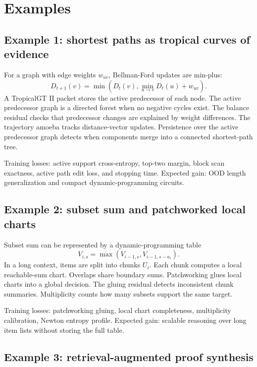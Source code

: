 \documentclass[11pt]{article}
\begin{document}
\section{Examples}

\subsection{Example 1: shortest paths as tropical curves of evidence}

For a graph with edge weights \(w_{uv}\), Bellman-Ford updates are min-plus:
\begin{equation}
D_{t+1}(v)=\min\left(D_t(v),\min_{u\to v}D_t(u)+w_{uv}\right).
\end{equation}
A TropicalGT II packet stores the active predecessor of each node.  The active predecessor graph is a directed forest when no negative cycles exist.  The balance residual checks that predecessor changes are explained by weight differences.  The trajectory amoeba tracks distance-vector updates.  Persistence over the active predecessor graph detects when components merge into a connected shortest-path tree.

Training losses: active support cross-entropy, top-two margin, block scan exactness, active path edit loss, and stopping time.  Expected gain: OOD length generalization and compact dynamic-programming circuits.

\subsection{Example 2: subset sum and patchworked local charts}

Subset sum can be represented by a dynamic-programming table
\begin{equation}
V_{i,s}=\max(V_{i-1,s},V_{i-1,s-a_i}).
\end{equation}
In a long context, items are split into chunks \(U_i\).  Each chunk computes a local reachable-sum chart.  Overlaps share boundary sums.  Patchworking glues local charts into a global decision.  The gluing residual detects inconsistent chunk summaries.  Multiplicity counts how many subsets support the same target.

Training losses: patchworking gluing, local chart completeness, multiplicity calibration, Newton entropy profile.  Expected gain: scalable reasoning over long item lists without storing the full table.

\subsection{Example 3: retrieval-augmented proof synthesis}
\end{document}
